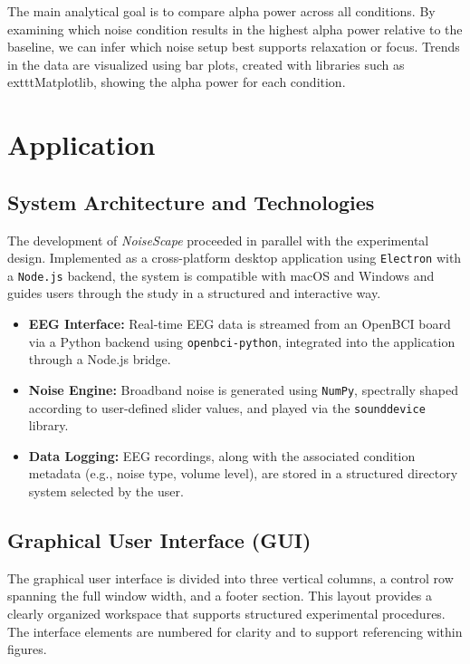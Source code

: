 The main analytical goal is to compare alpha power across all conditions. By examining which noise condition results in the highest alpha power relative to the baseline, we can infer which noise setup best supports relaxation or focus. Trends in the data are visualized using bar plots, created with libraries such as 	exttt{Matplotlib}, showing the alpha power for each condition.






\section{Application}

\subsection{System Architecture and Technologies}

The development of \textit{NoiseScape} proceeded in parallel with the experimental design. Implemented as a cross-platform desktop application using \texttt{Electron} with a \texttt{Node.js} backend, the system is compatible with macOS and Windows and guides users through the study in a structured and interactive way.

\begin{itemize}
\item \textbf{EEG Interface:} Real-time EEG data is streamed from an OpenBCI board via a Python backend using \texttt{openbci-python}, integrated into the application through a Node.js bridge.
\item \textbf{Noise Engine:} Broadband noise is generated using \texttt{NumPy}, spectrally shaped according to user-defined slider values, and played via the \texttt{sounddevice} library.
\item \textbf{Data Logging:} EEG recordings, along with the associated condition metadata (e.g., noise type, volume level), are stored in a structured directory system selected by the user.
\end{itemize}

\subsection{Graphical User Interface (GUI)}

The graphical user interface is divided into three vertical columns, a control row spanning the full window width, and a footer section. This layout provides a clearly organized workspace that supports structured experimental procedures. The interface elements are numbered for clarity and to support referencing within figures.

